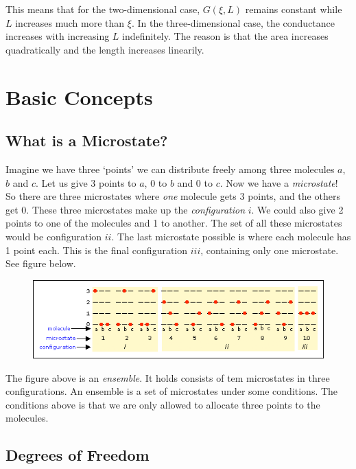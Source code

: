 \documentclass[11pt]{article}
\numberwithin{equation}{section}
\numberwithin{figure}{section}
\newcommand{\ita}[1]{\textit{#1}}
\renewcommand{\thesubsection}{\arabic{subsection}.}
\begin{document}
This means that for the two-dimensional case, $G(\xi, L)$
remains constant while $L$ increases much more than $\xi$.
In the three-dimensional case, the conductance increases
with increasing $L$ indefinitely. The reason is that the
area increases quadratically and the length increases linearily.




\renewcommand{\thesubsection}{\Alph{subsection}}

\newpage
\section{Basic Concepts}
\subsection{What is a Microstate?} 
Imagine we have three `points' we can distribute freely among
three molecules $a$, $b$ and $c$.
Let us give 3 points to $a$, 0 to $b$ and 0 to $c$.
Now we have a \ita{microstate}!
So there are three microstates where \ita{one} molecule
gets 3 points, and the others get 0. These three microstates
make up the \ita{configuration} $i$.
We could also give 2 points to one of the molecules
and 1 to another. The set of all these microstates 
would be configuration $ii$.
The last microstate possible is where each molecule has
1 point each. This is the final configuration $iii$,
containing only one microstate. See figure below.

\begin{figure}[h]
    \centering
    \includegraphics[width=\textwidth]{figures/md-figures/microstates.png}    
\end{figure}

The figure above is an \ita{ensemble}. It holds consists of
tem microstates in three configurations. An ensemble is a set of
microstates under some conditions. The conditions above is
that we are only allowed to allocate three points to the molecules.

\subsection{Degrees of Freedom} 
\end{document}
